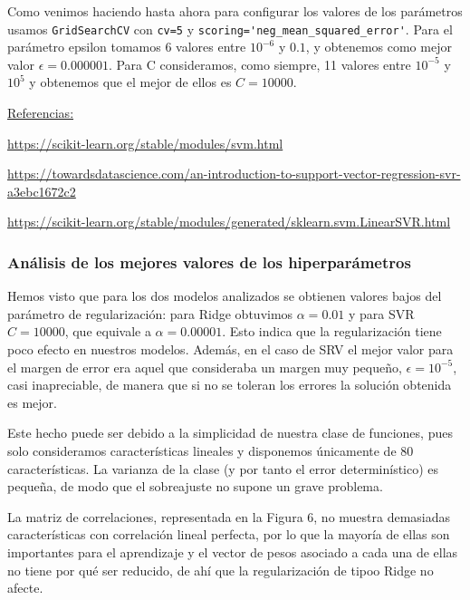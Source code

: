 \documentclass[a4]{article}
\begin{document}
Como venimos haciendo hasta ahora para configurar los valores de los parámetros usamos \lstinline|GridSearchCV| con \lstinline|cv=5| y \lstinline|scoring='neg_mean_squared_error'|. Para el parámetro epsilon tomamos 6 valores entre $10^{-6}$ y $0.1$, y obtenemos como mejor valor $\epsilon=0.000001 $. Para C consideramos, como siempre, 11 valores entre $10^{-5}$ y $10^5$ y obtenemos que el mejor de ellos es $C=10000$. 

\underline{Referencias:} 

\href{https://scikit-learn.org/stable/modules/svm.html#mathematical-formulation}{https://scikit-learn.org/stable/modules/svm.html}

\href{https://towardsdatascience.com/an-introduction-to-support-vector-regression-svr-a3ebc1672c2}{https://towardsdatascience.com/an-introduction-to-support-vector-regression-svr-a3ebc1672c2}

\href{https://scikit-learn.org/stable/modules/generated/sklearn.svm.LinearSVR.html#sklearn.svm.LinearSVR}{https://scikit-learn.org/stable/modules/generated/sklearn.svm.LinearSVR.html}

\subsubsection{Análisis de los mejores valores de los hiperparámetros}

Hemos visto que para los dos modelos analizados se obtienen valores bajos del parámetro de regularización: para Ridge obtuvimos $\alpha=0.01$ y para SVR $C=10000$, que equivale a $\alpha=0.00001$. Esto indica que la regularización tiene poco efecto en nuestros modelos. Además, en el caso de SRV el mejor valor para el margen de error era aquel que consideraba un margen muy pequeño, $\epsilon=10^{-5}$, casi inapreciable, de manera que si no se toleran los errores la solución obtenida es mejor. 

Este hecho puede ser debido a la simplicidad de nuestra clase de funciones, pues solo consideramos características lineales y disponemos únicamente de 80 características. La varianza de la clase (y por tanto el error determinístico) es pequeña, de modo que el sobreajuste no supone un grave problema. 

La matriz de correlaciones, representada en la Figura 6, no muestra demasiadas características con correlación lineal perfecta, por lo que la mayoría de ellas son importantes para el aprendizaje y el vector de pesos asociado a cada una de ellas no tiene por qué ser reducido, de ahí que la regularización de tipoo Ridge no afecte. 
\end{document}
